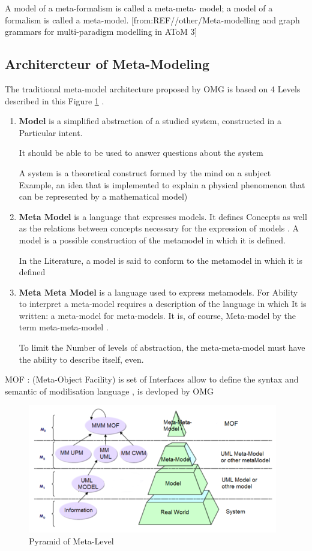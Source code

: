 A model of a meta-formalism is called a meta-meta-
model; a model of a formalism is called a meta-model.
[from:REF//other/Meta-modelling and graph grammars for multi-paradigm modelling in AToM 3]

\subsection{Architercteur of Meta-Modeling}
The traditional meta-model architecture proposed by OMG is based on 4 Levels
described in this Figure \ref{fig:Pyramid of Meta-Level} .

\begin{enumerate}
\item \textbf{Model} is a simplified abstraction of a studied system, constructed in a
Particular intent. 

It should be able to be used to answer questions about the system

A system is a theoretical construct formed by the mind on a subject
Example, an idea that is implemented to explain a physical phenomenon that can
be represented by a mathematical model) 

\item \textbf{Meta Model} is a language that expresses models. It defines
Concepts as well as the relations between concepts necessary for the expression of models . 
A model is a possible construction of the metamodel in which it is defined.

In the Literature, a model is said to conform to the metamodel in which it is defined

\item \textbf{Meta Meta Model} is a language used to express metamodels. 
For Ability to interpret a meta-model requires a description of the language in which
It is written: a meta-model for meta-models. 
It is, of course, Meta-model by the term meta-meta-model  . 

To limit the  Number of levels of abstraction, the meta-meta-model 
must have the ability to describe itself, even. 
 

\end{enumerate}

MOF : (Meta-Object Facility) is set of Interfaces allow to define 
the syntax and semantic of modilisation language , is devloped by OMG

\begin{figure}[th]
	\centering
		\includegraphics{chapiter3/img/Pyramid}
	\caption{\label{fig:Pyramid of Meta-Level}Pyramid of Meta-Level}
\end{figure} 



